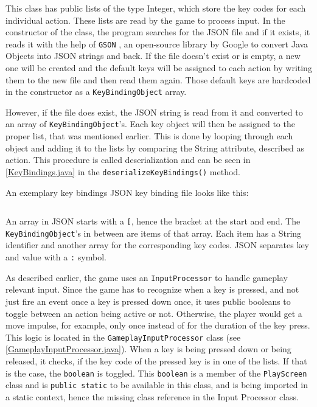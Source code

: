 \documentclass[12p]{article}
\begin{document}
This class has public lists of the type Integer, which store the key codes for each individual action. These lists are read by the game to process input. In the constructor of the class, the program searches for the JSON file and if it exists, it reads it with the help of \texttt{GSON} \cite{GSON}, an open-source library by Google to convert Java Objects into JSON strings and back. If the file doesn't exist or is empty, a new one will be created and the default keys will be assigned to each action by writing them to the new file and then read them again. Those default keys are hardcoded in the constructor as a \texttt{KeyBindingObject} array.

However, if the file does exist, the JSON string is read from it and converted to an array of \texttt{KeyBindingObject}'s. Each key object will then be assigned to the proper list, that was mentioned earlier. This is done by looping through each object and adding it to the lists by comparing the String attribute, described as \texttt{}{action}. This procedure is called deserialization and can be seen in \ref{KeyBindings.java} in the \texttt{deserializeKeyBindings()} method.

An exemplary key bindings JSON key binding file looks like this:
\inputminted[linenos,breaklines]{json}{code/json/keybindings.json}

An array in JSON starts with a \texttt{[}, hence the bracket at the start and end. The \texttt{KeyBindingObject}'s in between are items of that array. Each item has a String identifier and another array for the corresponding key codes. JSON separates key and value with a \texttt{:} symbol.

As described earlier, the game uses an \texttt{InputProcessor} to handle gameplay relevant input. Since the game has to recognize when a key is pressed, and not just fire an event once a key is pressed down once, it uses public booleans to toggle between an action being active or not. Otherwise, the player would get a move impulse, for example, only once instead of for the duration of the key press. This logic is located in the \texttt{GameplayInputProcessor} class (see \ref{GameplayInputProcessor.java}). When a key is being pressed down or being released, it checks, if the key code of the pressed key is in one of the lists. If that is the case, the \texttt{boolean} is toggled. This \texttt{boolean} is a member of the \texttt{PlayScreen} class and is \texttt{public static} to be available in this class, and is being imported in a static context, hence the missing class reference in the Input Processor class.
\end{document}
